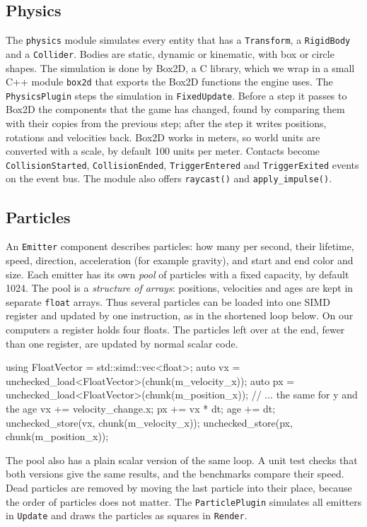 \documentclass[conference]{IEEEtran}
\newcommand{\code}[1]{\texttt{#1}}
\begin{document}
\subsection{Physics}

The \code{physics} module simulates every entity that has a \code{Transform}, a
\code{RigidBody} and a \code{Collider}. Bodies are static, dynamic or kinematic, with box
or circle shapes. The simulation is done by Box2D, a C library, which we wrap in a small
C++ module \code{box2d} that exports the Box2D functions the engine uses. The
\code{PhysicsPlugin} steps the simulation in \code{FixedUpdate}. Before a step it passes to
Box2D the components that the game has changed, found by comparing them with their copies
from the previous step; after the step it writes positions, rotations and velocities back.
Box2D works in meters, so world units are converted with a scale, by default 100 units per
meter. Contacts become \code{CollisionStarted}, \code{CollisionEnded},
\code{TriggerEntered} and \code{TriggerExited} events on the event bus. The module also
offers \code{raycast()} and \code{apply\_impulse()}.

\subsection{Particles}

An \code{Emitter} component describes particles: how many per second, their lifetime,
speed, direction, acceleration (for example gravity), and start and end color and size.
Each emitter has its own \emph{pool} of particles with a fixed capacity, by default 1024.
The pool is a \emph{structure of arrays}: positions, velocities and ages are kept in
separate \code{float} arrays. Thus several particles can be loaded into one SIMD register
and updated by one instruction, as in the shortened loop below. On our computers a
register holds four floats. The particles left over at the end, fewer than one register,
are updated by normal scalar code.

\begin{codeblock}
using FloatVector = std::simd::vec<float>;
auto vx = unchecked_load<FloatVector>(chunk(m_velocity_x));
auto px = unchecked_load<FloatVector>(chunk(m_position_x));
// ... the same for y and the age
vx += velocity_change.x;
px += vx * dt;
age += dt;
unchecked_store(vx, chunk(m_velocity_x));
unchecked_store(px, chunk(m_position_x));
\end{codeblock}

The pool also has a plain scalar version of the same loop. A unit test checks that both
versions give the same results, and the benchmarks compare their speed. Dead particles
are removed by moving the last particle into their place, because the order of particles
does not matter. The \code{ParticlePlugin} simulates all emitters in \code{Update} and
draws the particles as squares in \code{Render}.
\end{document}
